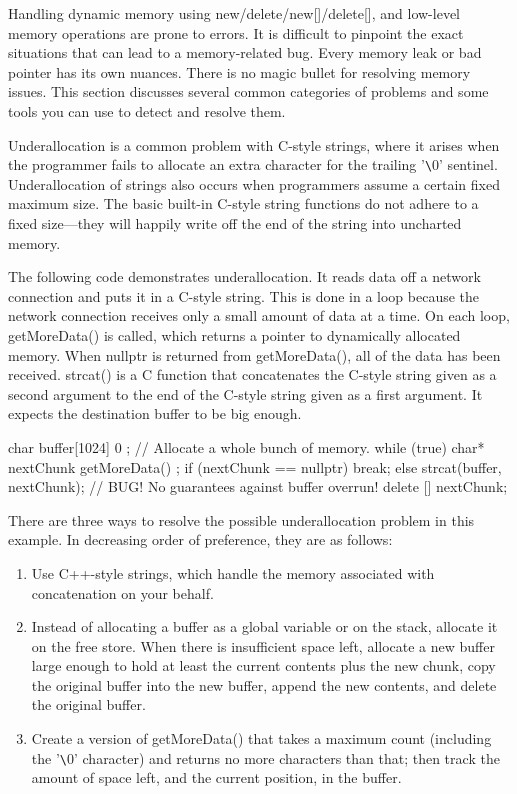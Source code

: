 
Handling dynamic memory using new/delete/new[]/delete[], and low-level memory operations are prone to errors. It is difficult to pinpoint the exact situations that can lead to a memory-related bug. Every memory leak or bad pointer has its own nuances. There is no magic bullet for resolving memory issues. This section discusses several common categories of problems and some tools you can use to detect and resolve them.


Underallocation is a common problem with C-style strings, where it arises when the programmer fails to allocate an extra character for the trailing '\verb|\|0' sentinel. Underallocation of strings also occurs when programmers assume a certain fixed maximum size. The basic built-in C-style string functions do not adhere to a fixed size—they will happily write off the end of the string into uncharted memory.

The following code demonstrates underallocation. It reads data off a network connection and puts it in a C-style string. This is done in a loop because the network connection receives only a small amount of data at a time. On each loop, getMoreData() is called, which returns a pointer to dynamically allocated memory. When nullptr is returned from getMoreData(), all of the data has been received. strcat() is a C function that concatenates the C-style string given as a second argument to the end of the C-style string given as a first argument. It expects the destination buffer to be big enough.

\begin{cpp}
char buffer[1024] { 0 }; // Allocate a whole bunch of memory.
while (true) {
    char* nextChunk { getMoreData() };
    if (nextChunk == nullptr) {
        break;
    } else {
        strcat(buffer, nextChunk); // BUG! No guarantees against buffer overrun!
        delete [] nextChunk;
    }
}
\end{cpp}

There are three ways to resolve the possible underallocation problem in this example. In decreasing order of preference, they are as follows:

\begin{enumerate}
\item
Use C++-style strings, which handle the memory associated with concatenation on your behalf.

\item
Instead of allocating a buffer as a global variable or on the stack, allocate it on the free store. When there is insufficient space left, allocate a new buffer large enough to hold at least the current contents plus the new chunk, copy the original buffer into the new buffer, append the new contents, and delete the original buffer.

\item
Create a version of getMoreData() that takes a maximum count (including the '\verb|\|0' character) and returns no more characters than that; then track the amount of space left, and the current position, in the buffer.
\end{enumerate}

